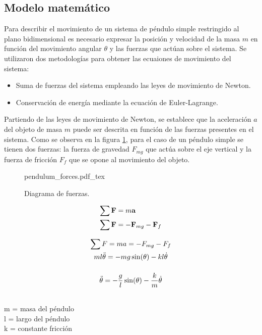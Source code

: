 
\subsection{Modelo matemático}

Para describir el movimiento de un sistema de péndulo simple 
restringido al plano bidimensional es necesario expresar 
la posición y velocidad de la masa $m$ en función del movimiento
angular $\theta$ y las fuerzas que actúan sobre el sistema.
Se utilizaron dos metodologías para obtener las ecuaiones
de movimiento del sistema: 
\begin{itemize}
 \item Suma de fuerzas del sistema empleando las leyes de movimiento de Newton.
 \item Conservación de energía mediante la ecuación de Euler-Lagrange.
\end{itemize}


Partiendo de las leyes de movimiento de Newton, se establece que la aceleración
$a$ del objeto de masa $m$ puede ser descrita en función de las fuerzas 
presentes en el sistema. 
Como se observa en la figura \ref{fig: pendulum forces}, 
para el caso de un péndulo simple se tienen dos fuerzas:
la fuerza de gravedad $F_{mg}$ que actúa sobre el eje vertical 
y la fuerza de fricción $F_f$ que se opone al movimiento del objeto. 

 \begin{figure}[ht]
    \centering
    {pendulum_forces.pdf_tex}
    \caption{Diagrama de fuerzas.}
    \label{fig: pendulum forces}
\end{figure}

\begin{equation}
 \begin{split}
  \sum \bold{F} & = m \bold{a}\\
  \sum \bold{F} & = - \bold{F}_{mg} - \bold{F}_f
 \end{split}
 \label{eq: }
\end{equation}




\begin{large}
\begin{gather*}
\sum F = ma = -F_{mg} - F_f \\ \bigskip
ml\ddot{\theta} = -mg\sin(\theta) - kl\dot{\theta} \\ \bigskip
\ddot{\theta} = -\dfrac{g}{l}\sin(\theta) - \dfrac{k}{m}\dot{\theta} \\
\end{gather*} 
\end{large}
\begin{flushright}
\begin{small}
m = masa del péndulo\\
l = largo del péndulo\\
k = constante fricción\\
\end{small}
\end{flushright}

